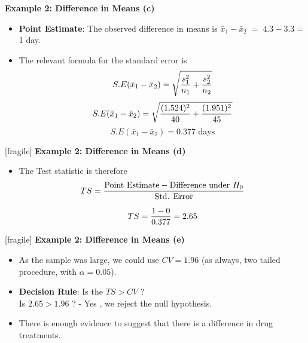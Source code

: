 \documentclass[a4]{beamer}
\begin{document}

\noindent \textbf{Example 2: Difference in Means (c) }
\begin{itemize}
\item \textbf{Point Estimate}: The observed difference in means is $\bar{x}_1-\bar{x}_2 \;= \;4.3-3.3 \;$= 1 day.
\vspace{0.2cm}
\item The relevant formula for the standard error is
\[ S.E(\bar{x}_1 - \bar{x}_2) = \sqrt{{s^2_1\over n_1}+{s^2_2 \over n_2}} \]
 \[ S.E(\bar{x}_1 - \bar{x}_2) = \sqrt{{(1.524)^2 \over 40}+{(1.951)^2 \over 45}}   \]\vspace{0.2cm}
 \[ S.E(\bar{x}_1 - \bar{x}_2) = 0.377\mbox{ days}\]
\end{itemize}


[fragile]
\noindent \textbf{Example 2: Difference in Means (d) }
\vspace{-1cm}
\begin{itemize}
\item The Test statistic is therefore
\[ TS = {\mbox{Point Estimate} - \mbox{Difference under } H_0 \over \mbox{Std. Error}} \]

\[TS = {1 - 0 \over 0.377 } = 2.65 \]


\end{itemize}



[fragile]
\noindent \textbf{Example 2: Difference in Means (e) }
\vspace{-1cm}
\begin{itemize}
\item As the sample was large, we could use $CV = 1.96$ (as always, two tailed procedure, with $\alpha=0.05$).

\item \textbf{Decision Rule}: Is the $TS > CV$ ? \\  Is $2.65 > 1.96$ ? - Yes , we reject the null hypothesis.
\item There is enough evidence to suggest that there is a difference in drug treatments.
\end{itemize}





\end{document}
